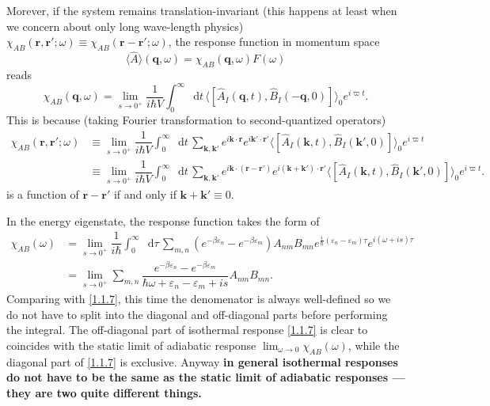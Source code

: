 \documentclass[10pt,nofootinbib,letterpaper]{revtex4}
\newcommand*\dd{\mathop{}\!\mathrm{d}}
\newcounter{Note}[section]
\newenvironment{Note}[1][]{{\par\normalfont\bfseries \underline{Note~\stepcounter{Note}\arabic{Note}.}~#1~~}}{\par}
\begin{document}
		Morever, if the system remains translation-invariant (this happens at least when we concern about only long wave-length physics) $\chi_{AB}(\bm{r},\bm{r'};\omega)\equiv\chi_{AB}(\bm{r}-\bm{r'};\omega)$, the response function in momentum space
		\begin{equation*}
			\langle\hat A\rangle(\bm{q},\omega)=\chi_{AB}(\bm{q},\omega)F(\omega)
		\end{equation*}
		reads
		\begin{equation}\label{1.2.9}
			\chi_{AB}(\bm{q},\omega)=\lim_{s \rightarrow0^+}\dfrac{1}{i\hbar V}\int_0^\infty\dd t\,\langle[\hat A_I(\bm{q},t),\hat B_I(\bm{-q},0)]\rangle_0 e^{i\varpi t}.
		\end{equation}
		This is because (taking Fourier transformation to second-quantized operators)
		\begin{align*}
			\chi_{AB}(\bm{r},\bm{r'};\omega)&\equiv\lim_{s \rightarrow0^+}\dfrac{1}{i\hbar V}\int_0^\infty\dd t\,\sum_{\bm{k},\bm{k'}} e^{i\bm{k}\cdot\bm{r}}e^{i\bm{k'}\cdot\bm{r'}}\langle[\hat A_I(\bm{k},t),\hat B_I(\bm{k'},0)]\rangle_0 e^{i\varpi t}\\
			&\equiv\lim_{s \rightarrow0^+}\dfrac{1}{i\hbar V}\int_0^\infty\dd t\,\sum_{\bm{k},\bm{k'}} e^{i\bm{k}\cdot(\bm{r}-\bm{r'})}e^{i(\bm{k}+\bm{k'})\cdot\bm{r'}}\langle[\hat A_I(\bm{k},t),\hat B_I(\bm{k'},0)]\rangle_0 e^{i\varpi t}.
		\end{align*}
		is a function of $\bm{r}-\bm{r'}$ if and only if $\bm{k}+\bm{k'}\equiv0$.\par
		In the energy eigenstate, the response function takes the form of
		\begin{align}
			\chi_{AB}(\omega)&=\lim_{s\rightarrow0^+}\dfrac{1}{i\hbar}\int_0^\infty\dd\tau\,\sum_{m,n}(e^{-\beta \varepsilon_n}-e^{-\beta \varepsilon_m})A_{nm}B_{mn}e^{\frac{i}{\hbar}(\varepsilon_n- \varepsilon_m)\tau} e^{i(\omega+is)\tau}\nonumber\\
			&=\lim_{s\rightarrow0^+}\sum_{m,n}\dfrac{e^{-\beta \varepsilon_n}-e^{-\beta \varepsilon_m}}{\hbar\omega+\varepsilon_n- \varepsilon_m+is}A_{nm}B_{mn}.\label{1.2.10}
		\end{align}
		Comparing with \eqref{1.1.7}, this time the denomenator is always well-defined so we do not have to split into the diagonal and off-diagonal parts before performing the integral.
		\begin{Note}
			The off-diagonal part of isothermal response \eqref{1.1.7} is clear to coincides with the static limit of adiabatic response $\displaystyle\lim_{\omega\rightarrow0}\chi_{AB}(\omega)$, while the diagonal part of \eqref{1.1.7} is exclusive. Anyway \textbf{in general isothermal responses do not have to be the same as the static limit of adiabatic responses --- they are two quite different things.}
		\end{Note}
\end{document}
